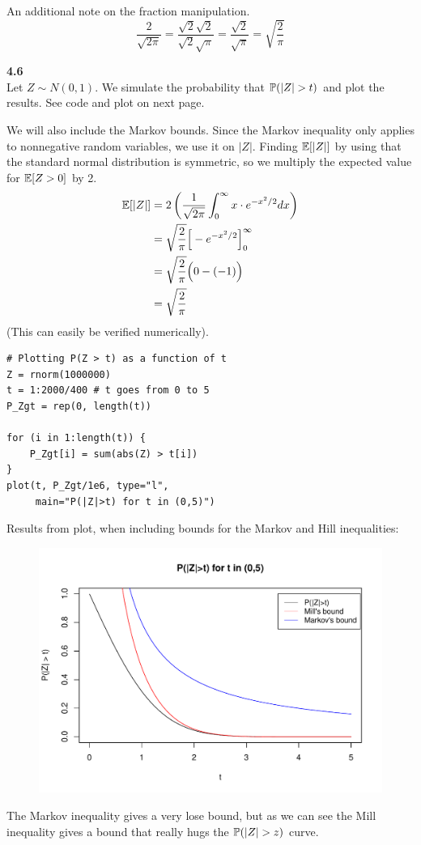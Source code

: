 \medskip\noindent
An additional note on the fraction manipulation.
$$
\frac{2}{\sqrt{2\pi}} = \frac{\sqrt{2}\sqrt{2}}{\sqrt{2}\sqrt{\pi}} = \frac{\sqrt{2}}{\sqrt{\pi}} = \sqrt{\frac{2}{\pi}}
$$


\bigskip\noindent
\textbf{4.6}\\  %
Let $Z\sim N(0,1)$. We simulate the probability that $\P(|Z| > t)$ and plot the results.
See code and plot on next page.

We will also include the Markov bounds. Since the Markov inequality only applies to
nonnegative random variables, we use it on $|Z|$. Finding $\E[|Z|]$ by using that
the standard normal distribution is symmetric, so we multiply the expected value for
$\E[Z > 0]$ by 2.
\begin{align*}
    \E[|Z|] &= 2\left(\frac{1}{\sqrt{2\pi}}\int_0^\infty x\cdot e^{-x^2/2}dx \right) \\
    &= \sqrt{\frac{2}{\pi}}\Big[-e^{-x^2/2}\Big]_0^\infty \\
    &= \sqrt{\frac{2}{\pi}}\Big(0 - ( - 1)\Big) \\
    &= \sqrt{\frac{2}{\pi}}
\end{align*}
(This can easily be verified numerically).

\newpage\noindent
\begin{lstlisting}[style=RSyntax, title=R]
# Plotting P(Z > t) as a function of t
Z = rnorm(1000000)
t = 1:2000/400 # t goes from 0 to 5
P_Zgt = rep(0, length(t))

for (i in 1:length(t)) {
    P_Zgt[i] = sum(abs(Z) > t[i])
} 
plot(t, P_Zgt/1e6, type="l",
     main="P(|Z|>t) for t in (0,5)")
\end{lstlisting}
Results from plot, when including bounds for the Markov and Hill inequalities:\\
\begin{figure}[H]
    \includegraphics[scale=0.85]{ch4_6.pdf}
\end{figure}
The Markov inequality gives a very lose bound, but as we can see the Mill inequality
gives a bound that really hugs the $\P(|Z| > z)$ curve.

